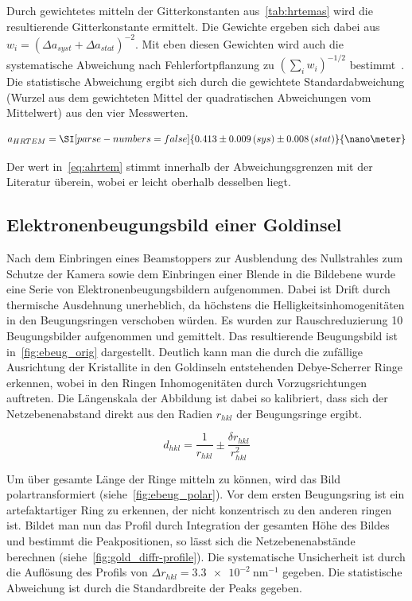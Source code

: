 \documentclass[slug=TEM, room=IFW, supervisor=?, coursedate=23.\ 01.\ 2020]{../../Lab_Report_LaTeX/lab_report}
\begin{document}
Durch gewichtetes mitteln der Gitterkonstanten aus~\ref{tab:hrtemas}
wird die resultierende Gitterkonstante ermittelt. Die Gewichte ergeben
sich dabei aus \(w_i = (\Delta a_{syst} + \Delta a_{stat})^{-2}\). Mit
eben diesen Gewichten wird auch die systematische Abweichung nach
Fehlerfortpflanzung zu \((\sum_i w_i)^{-1/2}\)
bestimmt~\cite{Aachen}. Die statistische Abweichung ergibt sich durch
die gewichtete Standardabweichung (Wurzel aus dem gewichteten Mittel
der quadratischen Abweichungen vom Mittelwert) aus den vier
Messwerten. 

\begin{equation}
  \label{eq:ahrtem}
  a_{HRTEM} = \SI[parse-numbers=false]{0.413\pm 0.009\,(sys)\pm 0.008\,(stat)}{\nano\meter} 
\end{equation}

Der wert in~\eqref{eq:ahrtem} stimmt innerhalb der Abweichungsgrenzen
mit der Literatur \"uberein, wobei er leicht oberhalb desselben liegt.

\subsection{Elektronenbeugungsbild einer Goldinsel}
\label{sec:golddiffr}

Nach dem Einbringen eines Beamstoppers zur Ausblendung des
Nullstrahles zum Schutze der Kamera sowie dem Einbringen einer Blende in die Bildebene
wurde eine Serie von
Elektronenbeugungsbildern aufgenommen. Dabei ist Drift durch
thermische Ausdehnung unerheblich, da h\"ochstens die
Helligkeitsinhomogenit\"aten in den Beugungsringen verschoben
w\"urden. Es wurden zur Rauschreduzierung 10 Beugungsbilder
aufgenommen und gemittelt. Das resultierende Beugungsbild ist
in~\ref{fig:ebeug_orig} dargestellt. Deutlich kann man die durch die
zuf\"allige Ausrichtung der Kristallite in den Goldinseln entstehenden
Debye-Scherrer Ringe erkennen, wobei in den Ringen Inhomogenit\"aten
durch Vorzugsrichtungen auftreten. Die L\"angenskala der Abbildung ist
dabei so kalibriert, dass sich der Netzebenenabstand direkt aus den
Radien \(r_{hkl}\) der Beugungsringe ergibt.

\begin{equation}
  \label{eq:beugrad}
  d_{hkl} = \frac{1}{r_{hkl}} \pm \frac{\delta r_{hkl}}{r_{hkl}^2}
\end{equation}

Um \"uber gesamte L\"ange der Ringe mitteln zu k\"onnen, wird das Bild
polartransformiert (siehe~\ref{fig:ebeug_polar}). Vor dem ersten
Beugungsring ist ein artefaktartiger Ring zu erkennen, der nicht
konzentrisch zu den anderen ringen ist. Bildet man nun das Profil
durch Integration der gesamten H\"ohe des Bildes und bestimmt die
Peakpositionen, so l\"asst sich die Netzebenenabst\"ande berechnen
(siehe~\ref{fig:gold_diffr-profile}). Die systematische Unsicherheit
ist durch die Aufl\"osung des Profils von
\(\Delta r_{hkl}=\SI{3.3e-2}{\nano\meter^{-1}}\) gegeben. Die
statistische Abweichung ist durch die Standardbreite der Peaks gegeben.
\end{document}
